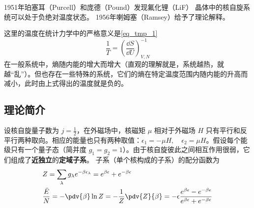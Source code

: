 
\begin{issues}
\issueDraft
\end{issues}

1951年珀塞耳（Purcell）和庞德（Pound）发现氟化锂（LiF） 晶体中的核自旋系统可以处于负绝对温度状态。
1956年喇姆塞（Ramsey）给予了理论解释。\cite{热统}

这里的温度在统计力学中的严格意义是\autoref{eq_tmp_1}~
\begin{equation}
\frac{1}{T}=\left(\frac{\dd S}{\dd U}\right)_{V,N}^{-1}
\end{equation}
在一般系统中，熵随内能的增大而增大（直观的理解就是，系统越热，就越“乱”）。但也存在一些特殊的系统，它们的熵在特定温度范围内随内能的升高而减小，此时由上式得出的温度就是负的。

\subsection{理论简介}
设核自旋量子数为 $j=\frac{1}{2}$，在外磁场中，核磁矩 $\mu$ 相对于外磁场 $H$ 只有平行和反平行两种取向。相应的能量也只有两种取值：$\epsilon_1=-\mu H,\quad \epsilon_2=\mu H$。假设每个能级只有一个量子态（简并度 $g_1=g_2=1$）。由于核自旋彼此之间相互作用很弱，它们组成了\textbf{近独立}的\textbf{定域子系}。
子系（单个核构成的子系）的配分函数为
\begin{equation}
\begin{aligned}
&Z=\sum_{\lambda}g_\lambda e^{-\beta \epsilon_\lambda}=e^{\beta \epsilon } +e^{-\beta \epsilon}\\
&\frac{\bar E}{N}=-\pdv{\beta} \ln Z=-\frac{1}{Z}\pdv{Z}{\beta}=-\epsilon\frac{e^{\beta\epsilon}-e^{-\beta\epsilon}}{e^{\beta\epsilon}+e^{-\beta\epsilon}}
\end{aligned}
\end{equation}

